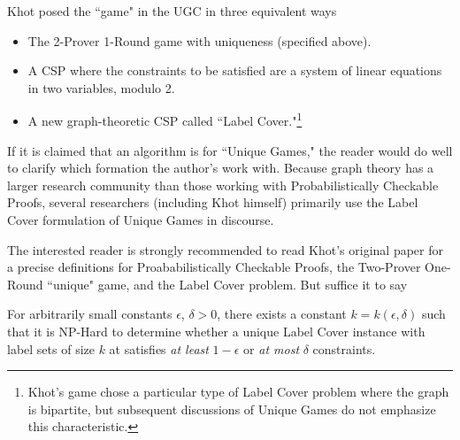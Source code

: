 Khot posed the ``game" in the UGC in three equivalent ways
\begin{itemize}
\item The 2-Prover 1-Round game with uniqueness (specified above).
\item A CSP where the constraints to be satisfied are a system of linear equations in two variables, modulo 2.
\item A new graph-theoretic CSP called ``Label Cover."\footnote{Khot's game chose a particular type of Label Cover problem where the graph is bipartite, but subsequent discussions of Unique Games do not emphasize this characteristic. }
\end{itemize}

If it is claimed that an algorithm is for ``Unique Games," the reader would do well to clarify which formation the author's work with. Because graph theory has a larger research community than those working with Probabilistically Checkable Proofs, several researchers (including Khot himself) primarily use the Label Cover formulation of Unique Games in discourse. 

The interested reader is strongly recommended to read Khot's original paper for a precise definitions for Proababilistically Checkable Proofs, the Two-Prover One-Round ``unique" game, and the Label Cover problem. But suffice it to say

\begin{ugc}
For arbitrarily small constants $\epsilon$, $\delta > 0$, there exists a constant $k = k(\epsilon,\delta)$ such that it is NP-Hard to determine whether a unique Label Cover instance with label sets of size $k$ at satisfies \textit{at least} $1-\epsilon$ or \textit{at most} $\delta$ constraints.
\end{ugc}




%
